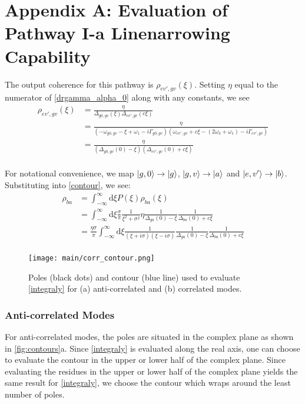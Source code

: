\documentclass[aip, jcp, reprint, twocolumn]{revtex4-2}
\begin{document}
\section{Appendix A: Evaluation of Pathway I-a Linenarrowing Capability}
\begin{widetext}
The output coherence  for this pathway is $\rho_{ev',gv}(\xi)$.
Setting $\eta$ equal to the numerator of \autoref{drgamma_alpha_0} along with any constants, we see
\begin{equation}\label{ev'gv}
	\begin{split}
		\rho_{ev',gv}(\xi) &= \frac{\eta}{\Delta_{g0,gv}(\xi) \Delta_{ev',gv}(c\xi)}\\
		&=  \frac{\eta}{(-\omega_{g0,gv} - \xi + \omega_1 - i\Gamma_{g0,gv})(\omega_{ev',gv} + c\xi - (2\omega_3 + \omega_1) - i\Gamma_{ev',gv})}\\ 
		&= \frac{\eta}{(\Delta_{g0,gv}(0) - \xi)(\Delta_{ev',gv}(0) + c\xi)}\\ 
	\end{split}
\end{equation}

For notational convenience, we map $\ket{g,0} \rightarrow \ket{g}$, $\ket{g,v} \rightarrow \ket{a}$ and $\ket{e,v'} \rightarrow \ket{b}$.
Substituting into \autoref{contour}, we see:
\begin{equation}\label{integraly}
	\begin{split}
		\rho_{ba} &= \int_{-\infty}^\infty \mathrm{d}\xi P(\xi) \rho_{ba}(\xi)\\
		&= \int_{-\infty}^\infty \mathrm{d}\xi \frac{\sigma}{\pi} \frac{1}{\xi^2 + \sigma^2} \eta \frac{1}{\Delta_{ga}(0) - \xi} \frac{1}{\Delta_{ba}(0) + c\xi}\\
		&= \frac{\eta \sigma}{\pi} \int_{-\infty}^\infty \mathrm{d}\xi\frac{1}{(\xi + i\sigma)(\xi - i\sigma)} \frac{1}{\Delta_{ga}(0) - \xi} \frac{1}{\Delta_{ba}(0) + c\xi}\\
	\end{split}
\end{equation}

\begin{figure}[!htbp]
	\centering
	\texttt{[image: main/corr\_contour.png]}
	\caption{Poles (black dots) and contour (blue line) used to evaluate \autoref{integraly} for (a) anti-correlated and (b) correlated modes.} 
	\label{fig:contours}
\end{figure}

\subsubsection{Anti-correlated Modes}
For anti-correlated modes, the poles are situated in the complex plane as shown in \autoref{fig:contours}a.
Since \autoref{integraly} is evaluated along the real axis, one can choose to evaluate the contour in the upper or lower half of the complex plane.
Since evaluating the residues in the upper or lower half of the complex plane yields the same result for \autoref{integraly}, we choose the contour which wraps around the least number of poles.


\end{widetext}
\end{document}
